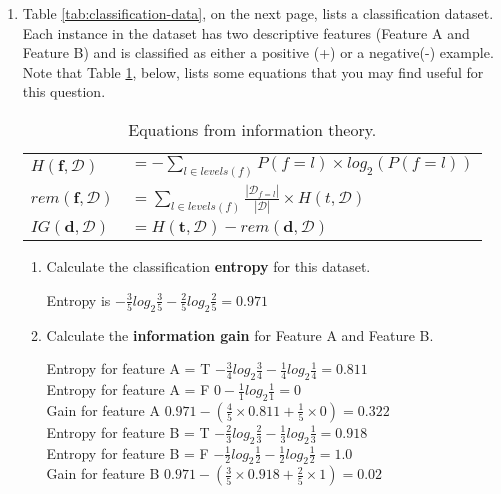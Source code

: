 \documentclass[--SOLUTION-OPTION--]{ditpaper}
\begin{document}
\begin{enumerate}
		\item Table \ref{tab:classification-data}, on the next page, lists a classification dataset. Each instance in the dataset has two descriptive features (Feature A and Feature B) and is classified as either a positive (+) or a negative(-) example. Note that Table \ref{tab:info-eqs}, below, lists some equations that you may find useful for this question.		
			\begin{table}[htb]
			\renewcommand{\arraystretch}{2}
	\begin{center}
	\caption{Equations from information theory.}
	\label{tab:info-eqs}
		\begin{tabular}{ll}
	\hline
	$H(\mathbf{f}, \mathcal{D})$ & $= -\displaystyle\sum_{l \in levels(f)} P(f=l) \times log_2(P(f=l))$\\
	$rem(\mathbf{f}, \mathcal{D})$ & $=\displaystyle\sum_{l \in levels(f)} \frac{|\mathcal{D}_{f=l}|}{|\mathcal{D}|} \times H(t, \mathcal{D})$\\
	$IG(\mathbf{d},\mathcal{D})$ & $=H(\mathbf{t}, \mathcal{D})-rem(\mathbf{d}, \mathcal{D})$\\
	\hline
	\end{tabular}
	\end{center}
	\end{table}
				\begin{enumerate}
			\item Calculate the classification \textbf{entropy} for this dataset.
			\begin{answer}
				Entropy is $-\frac{3}{5}log_2\frac{3}{5}-\frac{2}{5}log_2\frac{2}{5}=0.971$
			\end{answer}
			\item Calculate the \textbf{information gain} for Feature A and Feature B.
			\begin{answer}
				Entropy for feature A = T $-\frac{3}{4}log_2\frac{3}{4}-\frac{1}{4}log_2\frac{1}{4}=0.811$\\
				Entropy for feature A = F $0-\frac{1}{1}log_2\frac{1}{1}=0$\\
				Gain for feature A $0.971-(\frac{4}{5}\times0.811+\frac{1}{5}\times0)=0.322$\\
				Entropy for feature B = T $-\frac{2}{3}log_2\frac{2}{3}-\frac{1}{3}log_2\frac{1}{3}=0.918$\\
				Entropy for feature B = F $-\frac{1}{2}log_2\frac{1}{2}-\frac{1}{2}log_2\frac{1}{2}=1.0$\\
				Gain for feature B $0.971-(\frac{3}{5}\times0.918+\frac{2}{5}\times1)=0.02$\\
			\end{answer}
		\end{enumerate}
	\end{enumerate}
\end{document}
